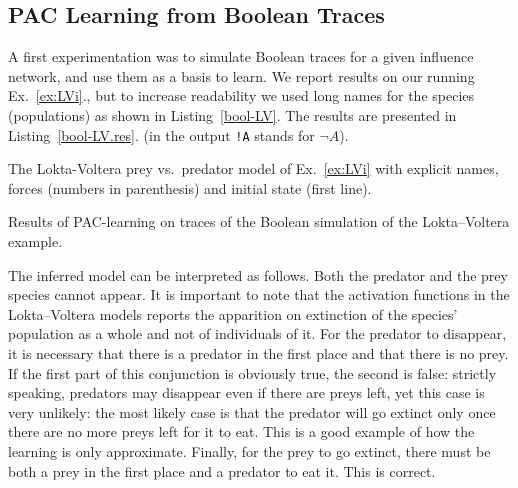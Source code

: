 \documentclass{llncs}
\begin{document}
\subsection{PAC Learning from Boolean Traces}

A first experimentation was to simulate Boolean traces for a given influence network, and use them as a basis to learn.
We report results on our running
Ex.~\ref{ex:LVi}., but to increase readability we used long names for the
species (populations) as shown in Listing~\ref{bool-LV}.
The results are presented in Listing~\ref{bool-LV.res}.
(in the output \texttt{!A} stands for $\neg A$).

\begin{listfig}[htp]
	
   \caption{The Lokta-Voltera prey vs.\ predator model of Ex.~\ref{ex:LVi}
   with explicit names, forces (numbers in parenthesis) and initial state
   (first line).\label{bool-LV}}
\end{listfig}%
\begin{listfig}[htp]
	
	\caption{Results of PAC-learning on traces of the Boolean simulation of the
   Lokta--Voltera example.\label{bool-LV.res}}
\end{listfig}

The inferred model can be interpreted as follows.
%
Both the predator and the prey species cannot appear. It is important to note that the activation functions in the Lokta--Voltera models reports the apparition on extinction of the species' population as a whole and not of individuals of it.
%
For the predator to disappear, it is necessary that there is a predator in the first place and that there is no prey. If the first part of this conjunction is obviously true, the second is false: strictly speaking, predators may disappear even if there are preys left, yet this case is very unlikely: the most likely case is that the predator will go extinct only once there are no more preys left for it to eat. This is a good example of how the learning is only approximate.
%
Finally, for the prey to go extinct, there must be both a prey in the first place and a predator to eat it. This is correct.
\end{document}
